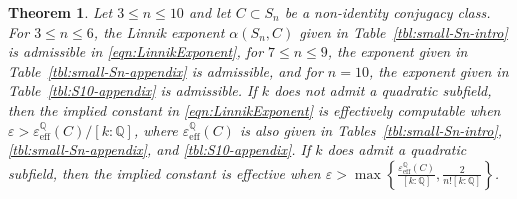\documentclass[12pt]{amsart}
\newtheorem{theorem}{Theorem}
\theoremstyle{definition} \newtheorem{definition}[theorem]{Definition}
\theoremstyle{example} \newtheorem{example}[theorem]{Example}
\theoremstyle{remark} \newtheorem{remark}{Remark}[theorem]
\numberwithin{equation}{section}
\numberwithin{theorem}{section}
\renewcommand{\epsilon}{\varepsilon}
\renewcommand{\leq}{\leqslant}
\begin{document}
	\begin{theorem}\label{thm:small-Sn-bowels}
		Let $3 \leq n \leq 10$ and let $C \subset S_n$ be a non-identity conjugacy class.  For $3 \leq n \leq 6$, the Linnik exponent $\alpha(S_n,C)$ given in Table~\ref{tbl:small-Sn-intro} is admissible in \eqref{eqn:LinnikExponent}, for $7 \leq n \leq 9$, the exponent given in Table~\ref{tbl:small-Sn-appendix} is admissible, and for $n=10$, the exponent given in Table~\ref{tbl:S10-appendix} is admissible.		
		If $k$ does not admit a quadratic subfield, then the implied constant in \eqref{eqn:LinnikExponent} is effectively computable when $\epsilon > {\epsilon_{\mathrm{eff}}^{\mathbb{Q}}(C)}/{[k:\mathbb{Q}]}$, where $\epsilon_\mathrm{eff}^\mathbb{Q}(C)$ is also given in Tables~\ref{tbl:small-Sn-intro}, \ref{tbl:small-Sn-appendix}, and \ref{tbl:S10-appendix}.  If $k$ does admit a quadratic subfield, then the implied constant is effective when $\epsilon > \max\left\{ \frac{\epsilon_{\mathrm{eff}}^{\mathbb{Q}}(C)}{[k:\mathbb{Q}]}, \frac{2}{n! [k:\mathbb{Q}]} \right\}$.
	\end{theorem}
	
\end{document}
